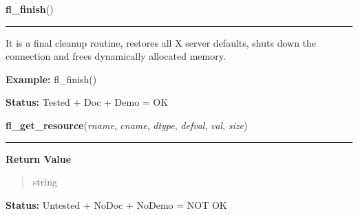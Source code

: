     \label{xformslib:library:fl_finish}

    \vspace{0.5ex}

\hspace{.8\funcindent}\begin{boxedminipage}{\funcwidth}

    \raggedright \textbf{fl\_finish}()

    \vspace{-1.5ex}

    \rule{\textwidth}{0.5\fboxrule}
\setlength{\parskip}{2ex}
    It is a final cleanup routine, restores all X server defaults, shuts 
    down the connection and frees dynamically allocated memory.

\setlength{\parskip}{1ex}
\textbf{Example:} fl\_finish()



\textbf{Status:} Tested + Doc + Demo = OK



    \end{boxedminipage}

    \label{xformslib:library:fl_get_resource}

    \vspace{0.5ex}

\hspace{.8\funcindent}\begin{boxedminipage}{\funcwidth}

    \raggedright \textbf{fl\_get\_resource}(\textit{rname}, \textit{cname}, \textit{dtype}, \textit{defval}, \textit{val}, \textit{size})

    \vspace{-1.5ex}

    \rule{\textwidth}{0.5\fboxrule}
\setlength{\parskip}{2ex}
\setlength{\parskip}{1ex}
      \textbf{Return Value}
    \vspace{-1ex}

      \begin{quote}
      string

      \end{quote}

\textbf{Status:} Untested + NoDoc + NoDemo = NOT OK



    \end{boxedminipage}

